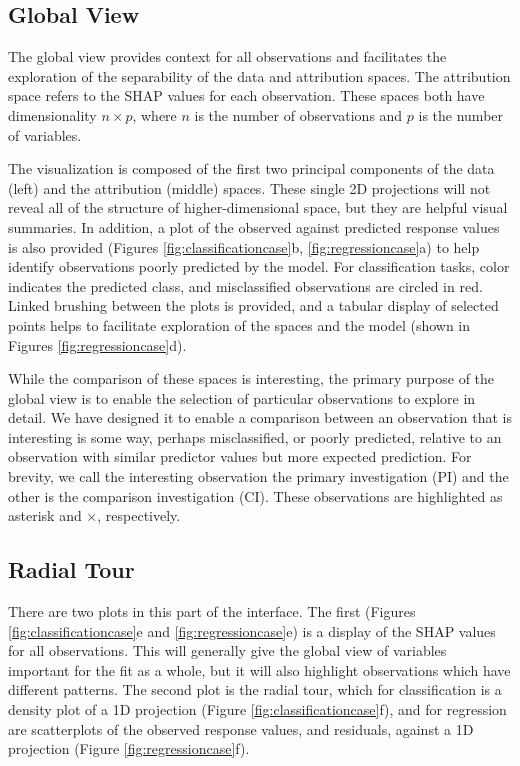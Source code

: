 \documentclass[
]{jss}
\begin{document}
\hypertarget{global-view}{%
\subsection{Global View}\label{global-view}}

The global view provides context for all observations and facilitates
the exploration of the separability of the data and attribution spaces.
The attribution space refers to the SHAP values for each observation.
These spaces both have dimensionality \(n \times p\), where \(n\) is the
number of observations and \(p\) is the number of variables.

The visualization is composed of the first two principal components of
the data (left) and the attribution (middle) spaces. These single 2D
projections will not reveal all of the structure of higher-dimensional
space, but they are helpful visual summaries. In addition, a plot of the
observed against predicted response values is also provided (Figures
\ref{fig:classificationcase}b, \ref{fig:regressioncase}a) to help
identify observations poorly predicted by the model. For classification
tasks, color indicates the predicted class, and misclassified
observations are circled in red. Linked brushing between the plots is
provided, and a tabular display of selected points helps to facilitate
exploration of the spaces and the model (shown in Figures
\ref{fig:regressioncase}d).

While the comparison of these spaces is interesting, the primary purpose
of the global view is to enable the selection of particular observations
to explore in detail. We have designed it to enable a comparison between
an observation that is interesting is some way, perhaps misclassified,
or poorly predicted, relative to an observation with similar predictor
values but more expected prediction. For brevity, we call the
interesting observation the primary investigation (PI) and the other is
the comparison investigation (CI). These observations are highlighted as
asterisk and \(\times\), respectively.

\hypertarget{radial-tour}{%
\subsection{Radial Tour}\label{radial-tour}}

There are two plots in this part of the interface. The first (Figures
\ref{fig:classificationcase}e and \ref{fig:regressioncase}e) is a
display of the SHAP values for all observations. This will generally
give the global view of variables important for the fit as a whole, but
it will also highlight observations which have different patterns. The
second plot is the radial tour, which for classification is a density
plot of a 1D projection (Figure \ref{fig:classificationcase}f), and for
regression are scatterplots of the observed response values, and
residuals, against a 1D projection (Figure \ref{fig:regressioncase}f).
\end{document}
